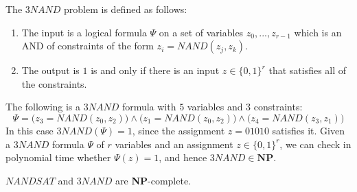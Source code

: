   \begin{definition}
    \label{def:the-3nand-problem}
  The $3NAND$ problem is defined as follows: 
  \begin{enumerate}
      \item The input is a logical formula $\Psi$ on a set of variables $z_0, ..., z_{r-1}$ which is an AND of constraints of the form $z_i = NAND(z_j, z_k)$. 
      \item The output is $1$ is and only if there is an input $z \in \{0, 1\}^r$ that satisfies all of the constraints. 
  \end{enumerate}
  \end{definition}

  \begin{example}
    \label{ex:a-3nand-formula}
  The following is a $3NAND$ formula with $5$ variables and $3$ constraints:
  \begin{equation}
    \Psi = \big( z_3 = NAND(z_0, z_2)\big) \wedge \big( z_1 = NAND(z_0, z_2)\big) \wedge \big( z_4 = NAND(z_3, z_1)\big)
  \end{equation}
  In this case $3NAND(\Psi) = 1$, since the assignment $z = 01010$ satisfies it. Given a $3NAND$ formula $\Psi$ of $r$ variables and an assignment $z \in \{0,1\}^r$, we can check in polynomial time whether $\Psi (z) = 1$, and hence $3NAND \in \mathbf{NP}$. 
  \end{example}

  \begin{theorem}
    \label{thm:np-completeness-of-nandsat-and-3nand}
  $NANDSAT$ and $3NAND$ are \textbf{NP}-complete. 
  \end{theorem}

